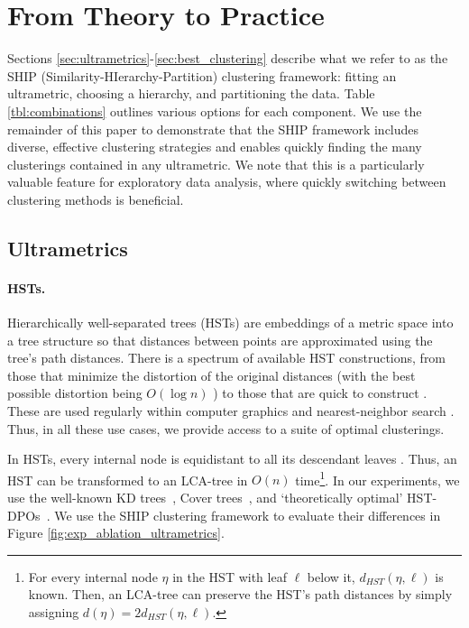 \section{From Theory to Practice}

Sections \ref{sec:ultrametrics}-\ref{sec:best_clustering} describe what we refer to as the SHIP (Similarity-HIerarchy-Partition) clustering framework: fitting an ultrametric, choosing a hierarchy, and partitioning the data. Table \ref{tbl:combinations} outlines various options for each component. We use the remainder of this paper to demonstrate that the SHIP framework includes diverse, effective clustering strategies and enables quickly finding the many clusterings contained in any ultrametric. We note that this is a particularly valuable feature for exploratory data analysis, where quickly switching between clustering methods is beneficial.




\subsection{Ultrametrics}\label{ssec:ultrametrics}

\paragraph{HSTs.}\label{ssec:kd_tree}


Hierarchically well-separated trees (HSTs) are embeddings of a metric space into a tree structure so that distances between points are approximated using the tree's path distances. There is a spectrum of available HST constructions, from those that minimize the distortion of the original distances (with the best possible distortion being $O(\log n)$ \citep{HST_2}) to those that are quick to construct \citep{hierarchical_kmedian}. 
These are used regularly within computer graphics \citep{kd_tree_graphics_1} and nearest-neighbor search \citep{kd_tree_nn_search_2, kd_tree_nn_search_3}. Thus, in all these use cases, we provide access to a suite of optimal clusterings.

In HSTs, every internal node is equidistant to all its descendant leaves \citep{hst_1}. Thus, an HST can be transformed to an LCA-tree in $O(n)$ time\footnote{For every internal node $\eta$ in the HST with leaf $\ell$ below it, $d_{H\!S\!T}(\eta, \ell)$ is known. Then, an LCA-tree can preserve the HST's path distances by simply assigning $d(\eta) = 2 d_{H\!S\!T}(\eta, \ell)$.}.
In our experiments, we use the well-known KD trees~\cite{kd_tree}, Cover trees~\cite{cover_tree}, and `theoretically optimal' HST-DPOs~\cite{hst_modern}. We use the SHIP clustering framework to evaluate their differences in Figure \ref{fig:exp_ablation_ultrametrics}.

